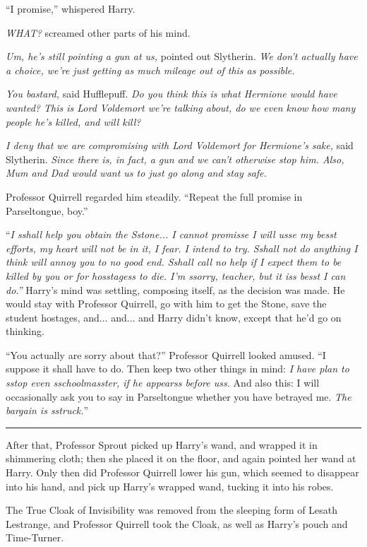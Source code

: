 ``I promise,'' whispered Harry.

\emph{WHAT?} screamed other parts of his mind.

\emph{Um, he's still pointing a gun at us,} pointed out Slytherin. \emph{We don't actually have a choice, we're just getting as much mileage out of this as possible.}

\emph{You bastard,} said Hufflepuff. \emph{Do you think this is what Hermione would have wanted? This is Lord Voldemort we're talking about, do we even know how many people he's killed, and will kill?}

\emph{I deny that we are compromising with Lord Voldemort for Hermione's sake,} said Slytherin. \emph{Since there is, in fact, a gun and we can't otherwise stop him. Also, Mum and Dad would want us to just go along and stay safe.}

Professor Quirrell regarded him steadily. ``Repeat the full promise in Parseltongue, boy.''

``\emph{I sshall help you obtain the Sstone... I cannot promisse I will usse my besst efforts, my heart will not be in it, I fear. I intend to try. Sshall not do anything I think will annoy you to no good end. Sshall call no help if I expect them to be killed by you or for hosstagess to die. I'm ssorry, teacher, but it iss besst I can do.''} Harry's mind was settling, composing itself, as the decision was made. He would stay with Professor Quirrell, go with him to get the Stone, save the student hostages, and... and... and Harry didn't know, except that he'd go on thinking.

``You actually are sorry about that?'' Professor Quirrell looked amused. ``I suppose it shall have to do. Then keep two other things in mind: \emph{I have plan to sstop even sschoolmasster, if he appearss before uss.} And also this: I will occasionally ask you to say in Parseltongue whether you have betrayed me. \emph{The bargain is sstruck.}''

\begin{center}\rule{3in}{0.4pt}\end{center}

After that, Professor Sprout picked up Harry's wand, and wrapped it in shimmering cloth; then she placed it on the floor, and again pointed her wand at Harry. Only then did Professor Quirrell lower his gun, which seemed to disappear into his hand, and pick up Harry's wrapped wand, tucking it into his robes.

The True Cloak of Invisibility was removed from the sleeping form of Lesath Lestrange, and Professor Quirrell took the Cloak, as well as Harry's pouch and Time-Turner.

